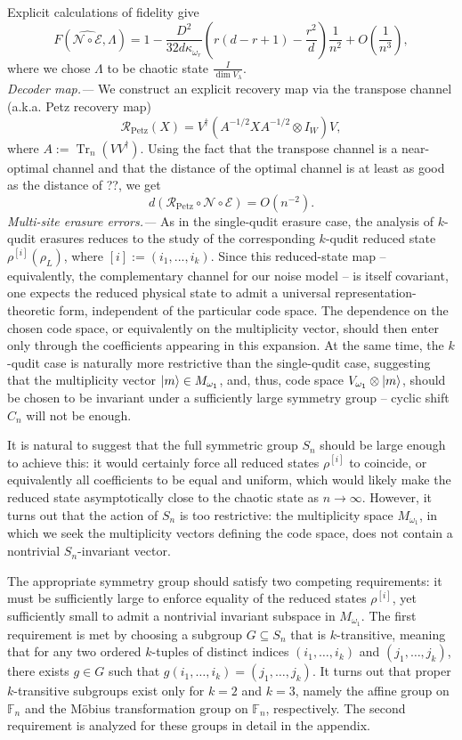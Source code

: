 \documentclass[twocolumn,superscriptaddress,aps,showpacs,amsmath,amstex,amssymb,citeautoscript,floatfix,pra,preprintnumbers]{revtex4-2}
\theoremstyle{plain}
\theoremstyle{plain}
\theoremstyle{plain}
\theoremstyle{plain}
\theoremstyle{plain}
\theoremstyle{plain}
\begin{document}
Explicit calculations of fidelity give
\[
    F(\widehat{\mathcal{N} \circ \mathcal{E}}, \Lambda)=1-\frac{D^2 }{32 d\kappa_{\omega_r}}\left(r(d-r+1)-\frac{r^2}{d}\right)\frac{1}{n^2}+O\left(\frac{1}{n^3}\right),
\]
where we chose $\Lambda$ to be chaotic state $\frac{I}{\operatorname{dim} V_\lambda}$.\\
\textit{Decoder map.---}
We construct an explicit recovery map via the transpose channel (a.k.a. Petz recovery map)
\[
    \mathcal{R}_{\mathrm{Petz}}(X)=V^{\dagger}\left(A^{-1 / 2} X A^{-1 / 2} \otimes I_W\right) V,
\]
where $A:=\operatorname{Tr}_n\left(V V^{\dagger}\right)$. Using the fact that the transpose channel is a near-optimal channel and that the distance of the optimal channel is at least as good as the distance of ??, we get
\[
    d(\mathcal{R}_{\mathrm{Petz}}\circ \mathcal{N}\circ \mathcal{E})=O\left(n^{-2}\right).
\]
\textit{Multi-site erasure errors.---} 
As in the single-qudit erasure case, the analysis of $k$-qudit erasures reduces to the study of the corresponding $k$-qudit reduced state $\rho^{[i]}(\rho_L)$, where $[i]:=(i_1, ..., i_k)$. Since this reduced-state map -- equivalently, the complementary channel for our noise model -- is itself covariant, one expects the reduced physical state to admit a universal representation-theoretic form, independent of the particular code space. The dependence on the chosen code space, or equivalently on the multiplicity vector, should then enter only through the coefficients appearing in this expansion. At the same time, the $k$-qudit case is naturally more restrictive than the single-qudit case, suggesting that the multiplicity vector $\ket{m}\in M_{\omega_{1}}$, and, thus, code space $V_{\omega_1}\otimes \ket{m}$, should be chosen to be invariant under a sufficiently large symmetry group -- cyclic shift $C_n$ will not be enough. 

It is natural to suggest that the full symmetric group $S_n$ should be large enough to achieve this: it would certainly force all reduced states $\rho^{[i]}$ to coincide, or equivalently all coefficients to be equal and uniform, which would likely make the reduced state asymptotically close to the chaotic state as $n \rightarrow \infty$. However, it turns out that the action of $S_n$ is too restrictive: the multiplicity space $M_{\omega_1}$, in which we seek the multiplicity vectors defining the code space, does not contain a nontrivial $S_n$-invariant vector.

The appropriate symmetry group should satisfy two competing requirements: it must be sufficiently large to enforce equality of the reduced states $\rho^{[i]}$, yet sufficiently small to admit a nontrivial invariant subspace in $M_{\omega_1}$. The first requirement is met by choosing a subgroup $G \subseteq S_n$ that is $k$-transitive, meaning that for any two ordered $k$-tuples of distinct indices $\left(i_1, \ldots, i_k\right)$ and $\left(j_1, \ldots, j_k\right)$, there exists $g \in G$ such that $g\left(i_1, \ldots, i_k\right)=\left(j_1, \ldots, j_k\right)$. It turns out that proper$k$-transitive subgroups exist only for $k=2$ and $k=3$, namely the affine group on $\mathbb{F}_n$ and the Möbius transformation group on $\mathbb{F}_n$, respectively. The second requirement is analyzed for these groups in detail in the appendix.
\end{document}

